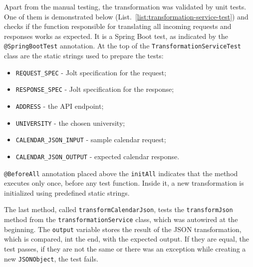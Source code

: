 Apart from the manual testing, the transformation was validated by unit tests. One of them is demonstrated below (List.~\ref{list:transformation-service-test}) and checks if the function responsible for translating all incoming requests and responses works as expected. It is a Spring Boot test, as indicated by the \texttt{@SpringBootTest} annotation. At the top of the \texttt{TransformationServiceTest} class are the static strings used to prepare the tests:
\begin{itemize}
    \item \texttt{REQUEST\_SPEC} - Jolt specification for the request;
    \item \texttt{RESPONSE\_SPEC} - Jolt specification for the response;
    \item \texttt{ADDRESS} - the API endpoint;
    \item \texttt{UNIVERSITY} - the chosen university;
    \item \texttt{CALENDAR\_JSON\_INPUT} - sample calendar request;
    \item \texttt{CALENDAR\_JSON\_OUTPUT} - expected calendar response.
\end{itemize}

\texttt{@BeforeAll} annotation placed above the \texttt{initAll} indicates that the method executes only once, before any test function. Inside it, a new transformation is initialized using predefined static strings.

The last method, called \texttt{transformCalendarJson}, tests the \texttt{transformJson} method from the \texttt{transformationService} class, which was autowired at the beginning. The \texttt{output} variable stores the result of the JSON transformation, which is compared, int the end, with the expected output. If they are equal, the test passes, if they are not the same or there was an exception while creating a new \texttt{JSONObject}, the test fails.


